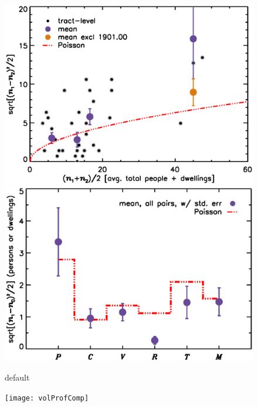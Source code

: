 \documentclass[11pt,twocolumn]{article}
\begin{document}
\begin{figure}[]
\centering
	\includegraphics[width=\linewidth]{intDupeChar}\\
	\includegraphics[width=\linewidth]{catDupeChar}
\caption{default}
\label{fig:dupeChar}
\end{figure}

\begin{figure}[]
	\centering
	\texttt{[image: volProfComp]}
	\caption{}
\end{figure}
\end{document}
